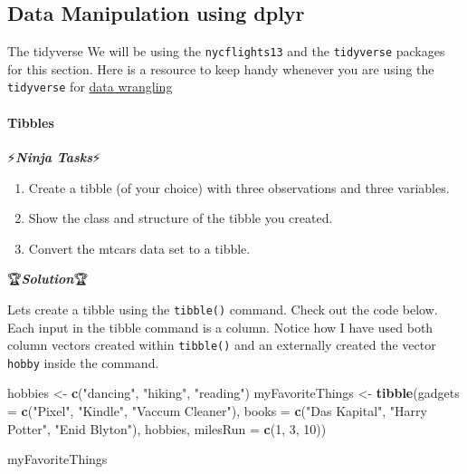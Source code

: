 \documentclass[]{article}
\newenvironment{Shaded}{\begin{snugshade}}{\end{snugshade}}
\newcommand{\KeywordTok}[1]{\textcolor[rgb]{0.13,0.29,0.53}{\textbf{#1}}}
\newcommand{\DataTypeTok}[1]{\textcolor[rgb]{0.13,0.29,0.53}{#1}}
\newcommand{\DecValTok}[1]{\textcolor[rgb]{0.00,0.00,0.81}{#1}}
\newcommand{\StringTok}[1]{\textcolor[rgb]{0.31,0.60,0.02}{#1}}
\newcommand{\NormalTok}[1]{#1}
\providecommand{\tightlist}{%
  \setlength{\itemsep}{0pt}\setlength{\parskip}{0pt}}
\let\oldparagraph\paragraph
\renewcommand{\paragraph}[1]{\oldparagraph{#1}\mbox{}}
\begin{document}
\subsection{Data Manipulation using
dplyr}\label{data-manipulation-using-dplyr}

The tidyverse We will be using the \texttt{nycflights13} and the
\texttt{tidyverse} packages for this section. Here is a resource to keep
handy whenever you are using the \texttt{tidyverse} for
\href{https://www.rstudio.com/wp-content/uploads/2015/02/data-wrangling-cheatsheet.pdf}{data
wrangling}

\paragraph{Tibbles}\label{tibbles}

⚡\textbf{\emph{Ninja Tasks}}⚡

\begin{enumerate}
\def\labelenumi{\arabic{enumi}.}
\tightlist
\item
  Create a tibble (of your choice) with three observations and three
  variables.
\item
  Show the class and structure of the tibble you created.
\item
  Convert the mtcars data set to a tibble.
\end{enumerate}

🏆\textbf{\emph{Solution}}🏆

Lets create a tibble using the \texttt{tibble()} command. Check out the
code below. Each input in the tibble command is a column. Notice how I
have used both column vectors created within \texttt{tibble()} and an
externally created the vector \texttt{hobby} inside the command.

\begin{Shaded}
\begin{Highlighting}[]
\NormalTok{hobbies <-}\StringTok{  }\KeywordTok{c}\NormalTok{(}\StringTok{"dancing"}\NormalTok{, }\StringTok{"hiking"}\NormalTok{, }\StringTok{"reading"}\NormalTok{)}
\NormalTok{myFavoriteThings <-}\StringTok{ }\KeywordTok{tibble}\NormalTok{(}\DataTypeTok{gadgets =} \KeywordTok{c}\NormalTok{(}\StringTok{"Pixel"}\NormalTok{, }\StringTok{"Kindle"}\NormalTok{, }\StringTok{"Vaccum Cleaner"}\NormalTok{), }\DataTypeTok{books =} \KeywordTok{c}\NormalTok{(}\StringTok{"Das Kapital"}\NormalTok{, }\StringTok{"Harry Potter"}\NormalTok{, }\StringTok{"Enid Blyton"}\NormalTok{), hobbies, }\DataTypeTok{milesRun =} \KeywordTok{c}\NormalTok{(}\DecValTok{1}\NormalTok{, }\DecValTok{3}\NormalTok{, }\DecValTok{10}\NormalTok{))}

\NormalTok{myFavoriteThings}
\end{Highlighting}
\end{Shaded}
\end{document}
